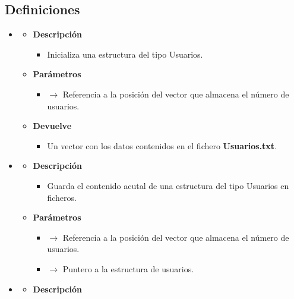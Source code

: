 \subsection{Definiciones}
\begin{itemize}
	\item {}
	\begin{itemize}
		\item \textbf{Descripción}
        \begin{itemize}
			\item Inicializa una estructura del tipo Usuarios.
		\end{itemize}
        \item \textbf{Parámetros}
		\begin{itemize}
			\item {} $\rightarrow$ Referencia a la posición del vector que almacena el número de usuarios.
		\end{itemize}
		\item \textbf{Devuelve}
		\begin{itemize}
			\item Un vector con los datos contenidos en el fichero \textbf{Usuarios.txt}.
		\end{itemize}
	\end{itemize}
	\item{}
	\begin{itemize}
		\item \textbf{Descripción}
        \begin{itemize}
			\item Guarda el contenido acutal de una estructura del tipo Usuarios en ficheros.
		\end{itemize}
        \item \textbf{Parámetros}
		\begin{itemize}
			\item {} $\rightarrow$ Referencia a la posición del vector que almacena el número de usuarios.
            \item {} $\rightarrow$ Puntero a la estructura de usuarios.
		\end{itemize}
	\end{itemize}
    \item{}
	\begin{itemize}
		\item \textbf{Descripción}
        \begin{itemize}

\end{itemize}
\end{itemize}
\end{itemize}
